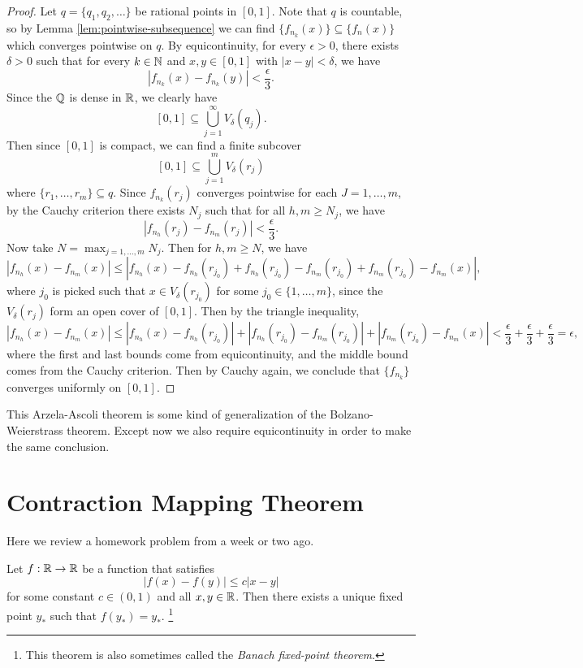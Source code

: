 \begin{proof}
  Let $q = \{q_1, q_2, \dots\}$ be rational points
  in $[0, 1]$. Note that $q$ is countable, so by
  Lemma \ref{lem:pointwise-subsequence} we can find
  $\{f_{n_k}(x)\} \subseteq \{f_n(x)\}$ which converges
  pointwise on $q$. By equicontinuity, for
  every $\epsilon > 0$, there exists $\delta > 0$ such
  that for every $k \in \mathbb{N}$ and $x, y \in [0, 1]$
  with $|x - y| < \delta$, we have
  \[|f_{n_k}(x) - f_{n_k}(y)| < \frac{\epsilon}{3}.\]
  Since the $\mathbb{Q}$ is dense in $\mathbb{R}$, we clearly have
  \[[0, 1] \subseteq \bigcup_{j = 1}^\infty V_\delta(q_j).\]
  Then since $[0, 1]$ is compact, we can find a finite
  subcover
  \[
    [0, 1] \subseteq \bigcup_{j = 1}^m V_\delta(r_j)
  \]
  where $\{r_1, \dots, r_m\} \subseteq q$. Since
  $f_{n_k}(r_j)$ converges pointwise for each
  $J = 1, \dots, m$, by the Cauchy criterion there exists
  $N_j$ such that for all $h, m \ge N_j$, we have
  \[
    |f_{n_h}(r_j) - f_{n_m}(r_j)| < \frac{\epsilon}{3}
  .\]
  Now take $N = \max_{j = 1, \dots, m} N_j$. Then for
  $h, m \ge N$, we have
  \[
    |f_{n_h}(x) - f_{n_m}(x)| \le
    |f_{n_h}(x) - f_{n_h}(r_{j_0}) + f_{n_h}(r_{j_0})
    - f_{n_m}(r_{j_0}) + f_{n_m}(r_{j_0}) - f_{n_m}(x)|,
  \]
  where $j_0$ is picked such that $x \in V_\delta(r_{j_0})$
  for some $j_0 \in \{1, \dots, m\}$, since the
  $V_\delta(r_j)$ form an open cover of $[0, 1]$. Then
  by the triangle inequality,
  \[
    |f_{n_h}(x) - f_{n_m}(x)| \le
    |f_{n_h}(x) - f_{n_h}(r_{j_0})| + |f_{n_h}(r_{j_0})
    - f_{n_m}(r_{j_0})| + |f_{n_m}(r_{j_0}) - f_{n_m}(x)|
    < \frac{\epsilon}{3} + \frac{\epsilon}{3} + \frac{\epsilon}{3}
    = \epsilon
  ,\]
  where the first and last bounds come from equicontinuity,
  and the middle bound comes from the Cauchy criterion.
  Then by Cauchy again, we conclude
  that $\{f_{n_k}\}$ converges uniformly on $[0, 1]$.
\end{proof}

\begin{remark}
  This Arzela-Ascoli theorem is some kind of generalization
  of the Bolzano-Weierstrass theorem. Except now we also
  require equicontinuity in order to make the
  same conclusion.
\end{remark}

\section{Contraction Mapping Theorem}
Here we review a homework problem from a week or two ago.
\begin{theorem}
  Let $f : \mathbb{R} \to \mathbb{R}$ be a function that satisfies
  \[|f(x) - f(y)| \le c|x - y|\]
  for some constant $c \in (0, 1)$ and all $x, y \in \mathbb{R}$.
  Then there exists a unique fixed point $y_*$ such
  that $f(y_*) = y_*$.
  \footnote{This theorem is also sometimes called the
  \textit{Banach fixed-point theorem}.}
\end{theorem}

